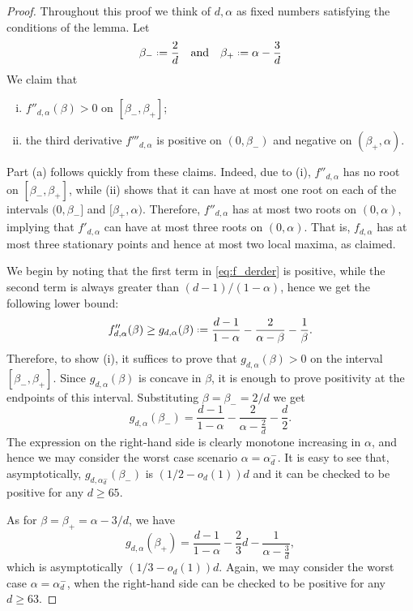 \documentclass[12pt]{amsart}
\theoremstyle{definition}
\newcommand\al{\alpha}
\newcommand\be{\beta}
\newcommand{\defeq}{\mathrel{\vcenter{\baselineskip0.5ex \lineskiplimit0pt
                     \hbox{\scriptsize.}\hbox{\scriptsize.}}}%
                     =}
\begin{document}
\begin{proof}
Throughout this proof we think of $d,\al$ as fixed numbers satisfying the conditions of the lemma. Let
%
\begin{equation} \label{eq:be+-}
\be_- \defeq \frac{2}{d}  
\quad \text{and} \quad 
\be_+ \defeq \al - \frac{3}{d} 
\end{equation}
%
We claim that 
%
\begin{enumerate}[(i)]
\item $f''_{d,\al}(\be)>0$ on $[\be_-,\be_+]$;
\item the third derivative $f'''_{d,\al}$ is positive on $(0,\be_-)$ and negative on $(\be_+,\al)$.
\end{enumerate}
%

Part (a) follows quickly from these claims. Indeed, due to (i), $f''_{d,\al}$ has no root on $[\be_-,\be_+]$, while (ii) shows that it can have at most one root on each of the intervals $(0,\be_-]$ and $[\be_+,\al)$. Therefore, $f''_{d,\al}$ has at most two roots on $(0,\al)$, implying that $f'_{d,\al}$
can have at most three roots on $(0,\al)$. That is, $f_{d,\al}$ has at most three stationary points and hence at most two local maxima, as claimed.

We begin by noting that the first term in \eqref{eq:f_derder} is positive, while the second term is always greater than $(d-1)/(1-\al)$, hence we get the following lower bound: 
%
\[ f''_{d,\al}(\be) 
\geq g_{d,\al}(\be) \defeq
\frac{d-1}{1-\al}-\frac{2}{\al-\be}-\frac{1}{\be} .\]
%
Therefore, to show (i), it suffices to prove that $g_{d,\al}(\be)>0$ on the interval $[\be_-,\be_+]$. Since $g_{d,\al}(\be)$ is concave in $\be$, it is enough to prove positivity at the endpoints of this interval. Substituting $\be=\be_-=2/d$ we get 
%
\[ g_{d,\al}(\be_-) 
= \frac{d-1}{1-\al}-\frac{2}{\al-\frac{2}{d}}- \frac{d}{2} .\]
%
The expression on the right-hand side is clearly monotone increasing in $\al$, and hence we may consider the worst case scenario $\al=\al_d^-$. It is easy to see that, asymptotically, $g_{d,\al_d^-}(\be_-)$ is $(1/2-o_d(1)) d$ and it can be checked to be positive for any $d \geq 65$.

As for $\be=\be_+=\al-3/d$, we have
%
\[ g_{d,\al}(\be_+) 
= \frac{d-1}{1-\al}-\frac{2}{3}d- \frac{1}{\al-\frac{3}{d}} ,\]
%
which is asymptotically $(1/3-o_d(1)) d$. Again, we may consider the worst case $\al=\al_d^-$, when the right-hand side can be checked to be positive for any $d \geq 63$.


\end{proof}
\end{document}

